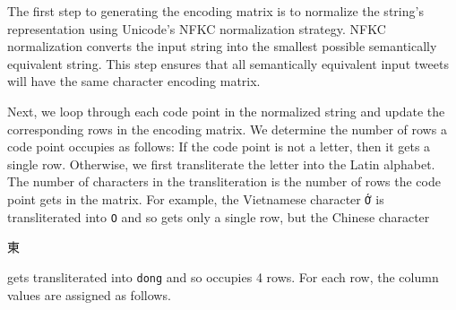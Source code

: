 \documentclass[sigconf,anonymous,review]{acmart}
\newcommand{\str}[1]{\texttt{#1}}
\begin{document}
\begin{description}
The first step to generating the encoding matrix is to normalize the string's representation using Unicode's NFKC normalization strategy.
NFKC normalization converts the input string into the smallest possible semantically equivalent string.
This step ensures that all semantically equivalent input tweets will have the same character encoding matrix.

Next, we loop through each code point in the normalized string and update the corresponding rows in the encoding matrix.
We determine the number of rows a code point occupies as follows:
If the code point is not a letter, then it gets a single row.
Otherwise, we first transliterate the letter into the Latin alphabet.
The number of characters in the transliteration is the number of rows the code point gets in the matrix.
For example, the Vietnamese character \str{\foreignlanguage{vietnamese}{Ớ}} is transliterated into \str{O} and so gets only a single row,
but the Chinese character \begin{CJK}{UTF8}{min}東\end{CJK} gets transliterated into \str{dong} and so occupies 4 rows.
For each row, the column values are assigned as follows.


\end{description}
\end{document}
